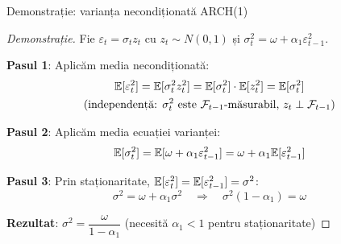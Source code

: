 \documentclass[9pt, aspectratio=169, t]{beamer}
\begin{document}
\begin{frame}{Demonstrație: varianța necondiționată ARCH(1)}
    \small
        \begin{proof}[Demonstrație]
            Fie $\varepsilon_t = \sigma_t z_t$ cu $z_t \sim N(0,1)$ și $\sigma_t^2 = \omega + \alpha_1 \varepsilon_{t-1}^2$.

            \vspace{0.1cm}
            \textbf{Pasul 1}: Aplicăm media necondiționată:
            \vspace{-2mm}
            \begin{multline*}
                \mathbb{E}[\varepsilon_t^2] = \mathbb{E}[\sigma_t^2 z_t^2] = \mathbb{E}[\sigma_t^2] \cdot \mathbb{E}[z_t^2] = \mathbb{E}[\sigma_t^2] \\
                \text{(independență: $\sigma_t^2$ este $\mathcal{F}_{t-1}$-măsurabil, $z_t \perp \mathcal{F}_{t-1}$)}
            \end{multline*}
            \vspace{-1mm}

            \textbf{Pasul 2}: Aplicăm media ecuației varianței:
            \vspace{-2mm}
            \[
                \mathbb{E}[\sigma_t^2] = \mathbb{E}[\omega + \alpha_1 \varepsilon_{t-1}^2] = \omega + \alpha_1 \mathbb{E}[\varepsilon_{t-1}^2]
            \]
            \vspace{-1mm}

            \textbf{Pasul 3}: Prin staționaritate, $\mathbb{E}[\varepsilon_t^2] = \mathbb{E}[\varepsilon_{t-1}^2] = \sigma^2$:
            \vspace{-2mm}
            \[
                \sigma^2 = \omega + \alpha_1 \sigma^2 \quad \Rightarrow \quad \sigma^2 (1 - \alpha_1) = \omega
            \]
            \vspace{-1mm}

            \textbf{Rezultat}: $\boxed{\sigma^2 = \dfrac{\omega}{1 - \alpha_1}}$ \quad (necesită $\alpha_1 < 1$ pentru staționaritate)
        \end{proof}
\end{frame}
\end{document}
